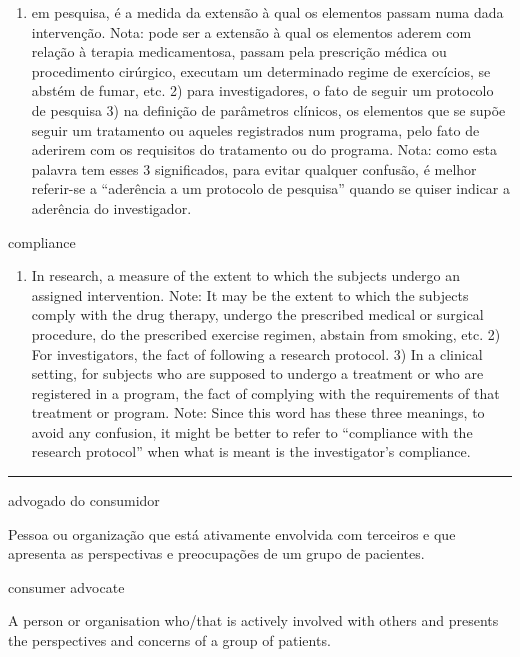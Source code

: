 \documentclass[
]{book}
\providecommand{\tightlist}{%
  \setlength{\itemsep}{0pt}\setlength{\parskip}{0pt}}
\begin{document}
\begin{enumerate}
\def\labelenumi{\arabic{enumi})}
\tightlist
\item
  em pesquisa, é a medida da extensão à qual os elementos passam numa dada intervenção. Nota: pode ser a extensão à qual os elementos aderem com relação à terapia medicamentosa, passam pela prescrição médica ou procedimento cirúrgico, executam um determinado regime de exercícios, se abstém de fumar, etc. 2) para investigadores, o fato de seguir um protocolo de pesquisa 3) na definição de parâmetros clínicos, os elementos que se supõe seguir um tratamento ou aqueles registrados num programa, pelo fato de aderirem com os requisitos do tratamento ou do programa. Nota: como esta palavra tem esses 3 significados, para evitar qualquer confusão, é melhor referir-se a ``aderência a um protocolo de pesquisa'' quando se quiser indicar a aderência do investigador.
\end{enumerate}

compliance

\begin{enumerate}
\def\labelenumi{\arabic{enumi})}
\tightlist
\item
  In research, a measure of the extent to which the subjects undergo an assigned intervention. Note: It may be the extent to which the subjects comply with the drug therapy, undergo the prescribed medical or surgical procedure, do the prescribed exercise regimen, abstain from smoking, etc. 2) For investigators, the fact of following a research protocol. 3) In a clinical setting, for subjects who are supposed to undergo a treatment or who are registered in a program, the fact of complying with the requirements of that treatment or program. Note: Since this word has these three meanings, to avoid any confusion, it might be better to refer to ``compliance with the research protocol'' when what is meant is the investigator's compliance.
\end{enumerate}

\begin{center}\rule{0.5\linewidth}{0.5pt}\end{center}

advogado do consumidor

Pessoa ou organização que está ativamente envolvida com terceiros e que apresenta as perspectivas e preocupações de um grupo de pacientes.

consumer advocate

A person or organisation who/that is actively involved with others and presents the perspectives and concerns of a group of patients.
\end{document}
